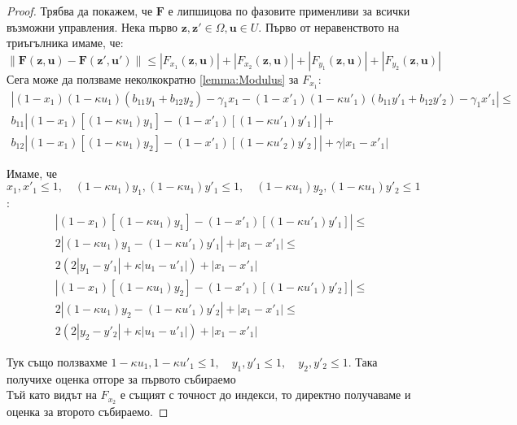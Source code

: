 \begin{proof}
  Трябва да покажем, че $\mathbf{F}$ е липшицова по фазовите применливи за всички възможни управления. Нека първо $\mathbf{z}, \mathbf{z}' \in \Omega, \mathbf{u} \in U$.
  Първо от неравенството на триъгълника имаме, че:
  \begin{equation}
    \|\mathbf{F}(\mathbf{z}, \mathbf{u}) - \mathbf{F}(\mathbf{z}', \mathbf{u}')\| \leq
    |F_{x_1}(\mathbf{z}, \mathbf{u})| + |F_{x_2}(\mathbf{z}, \mathbf{u})| + |F_{y_1}(\mathbf{z}, \mathbf{u})| + |F_{y_2}(\mathbf{z}, \mathbf{u})|
  \end{equation}
  Сега може да ползваме неколкократно \ref{lemma:Modulus} за $F_{x_1}$:
  \begin{multline}
    |(1-x_1) (1-\kappa u_1) \left(b_{11} y_1 + b_{12} y_2\right) - \gamma_1 x_1 - (1-x'_1) (1-\kappa u'_1) \left(b_{11} y'_1 + b_{12} y'_2\right) - \gamma_1 x'_1| \leq \\
    b_{11} \left|(1-x_1)[(1 - \kappa u_1) y_1] -  (1-x'_1)[(1 - \kappa u'_1) y'_1]\right| + \\
    b_{12} \left|(1-x_1)[(1 - \kappa u_1) y_2] -  (1-x'_1)[(1 - \kappa u'_2) y'_2]\right| + \gamma |x_1 - x'_1|
  \end{multline}

  Имаме, че $x_1, x'_1 \leq 1, \quad (1-\kappa u_1)y_1, (1-\kappa u_1) y'_1 \leq 1, \quad (1-\kappa u_1)y_2, (1-\kappa u_1) y'_2 \leq 1$:
  \begin{multline}
    \left|(1-x_1) [(1-\kappa u_1) y_1] - (1-x'_1) [(1-\kappa u'_1) y'_1]\right| \leq \\
    2 |(1-\kappa u_1) y_1 - (1-\kappa u'_1) y'_1| + |x_1 - x'_1| \leq \\
    2 (2|y_1 - y'_1| + \kappa |u_1 - u'_1|) + |x_1 - x'_1|
  \end{multline}
  \begin{multline}
    \left|(1-x_1) [(1-\kappa u_1) y_2] - (1-x'_1) [(1-\kappa u'_1) y'_2]\right| \leq \\
    2 |(1-\kappa u_1) y_2 - (1-\kappa u'_1) y'_2| + |x_1 - x'_1| \leq \\
    2 (2|y_2 - y'_2| + \kappa |u_1 - u'_1|) + |x_1 - x'_1|
  \end{multline}
  
  Тук също ползвахме $1-\kappa u_1, 1-\kappa u'_1 \leq 1, \quad y_1, y'_1 \leq 1, \quad y_2, y'_2 \leq 1$. Така получихе оценка отгоре за първото събираемо \\
  Тъй като видът на $F_{x_2}$ е същият с точност до индекси, то директно получаваме и оценка за второто събираемо.
  

\end{proof}
